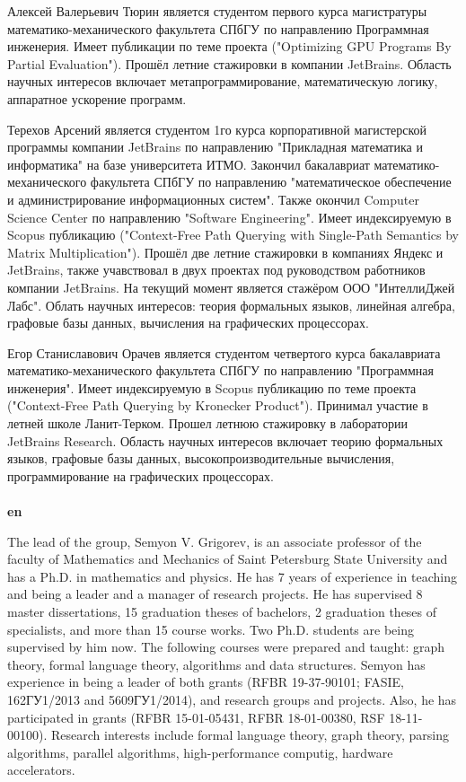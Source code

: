 \documentclass[12pt]{article}  %
\theoremstyle{remark}
\begin{document}
Алексей Валерьевич Тюрин является студентом первого курса магистратуры математико-механического факультета СПбГУ по направлению Программная инженерия. Имеет публикации по теме проекта ("Optimizing GPU Programs By Partial Evaluation"). Прошёл летние стажировки в компании JetBrains. Область научных интересов включает метапрограммирование, математическую логику, аппаратное ускорение программ.

Терехов Арсений является студентом 1го курса корпоративной магистерской программы компании JetBrains по направлению "Прикладная математика и информатика" на базе университета ИТМО. Закончил бакалавриат математико-механического факультета СПбГУ по направлению "математическое обеспечение и администрирование информационных систем". Также окончил Computer Science Center по направлению "Software Engineering". Имеет индексируемую в Scopus публикацию ("Context-Free Path Querying with Single-Path Semantics by Matrix Multiplication"). Прошёл две летние стажировки в компаниях Яндекс и JetBrains, также учавствовал в двух проектах под руководством работников компании JetBrains. На текущий момент является стажёром ООО "ИнтеллиДжей Лабс". Облать научных интересов: теория формальных языков, линейная алгебра, графовые базы данных, вычисления на графических процессорах.

Егор Станиславович Орачев является студентом четвертого курса бакалавриата математико-механического факультета СПбГУ по направлению "Программная инженерия". Имеет индексируемую в Scopus публикацию по теме проекта ("Context-Free Path Querying by Kronecker Product"). Принимал участие в летней школе Ланит-Терком. Прошел летнюю стажировку в лаборатории JetBrains Research. Область научных интересов включает теорию формальных языков, графовые базы данных, высокопроизводительные вычисления, программирование на графических процессорах.
\\
\\
\textbf{en}

The lead of the group, Semyon V. Grigorev, is an associate professor of the faculty of Mathematics and Mechanics of Saint Petersburg State University and has a Ph.D. in mathematics and physics. He has 7 years of experience in teaching and being a leader and a manager of research projects. He has supervised 8 master dissertations, 15 graduation theses of bachelors, 2 graduation theses of specialists, and more than 15 course works. Two Ph.D. students are being supervised by him now. The following courses were prepared and taught: graph theory, formal language theory, algorithms and data structures. Semyon has experience in being a leader of both grants  (RFBR 19-37-90101; FASIE, 162ГУ1/2013 and 5609ГУ1/2014), and research groups and projects. Also, he has participated in grants (RFBR 15-01-05431, RFBR 18-01-00380, RSF 18-11-00100). Research interests include formal language theory, graph theory, parsing algorithms, parallel algorithms, high-performance computig, hardware accelerators.
\end{document}
